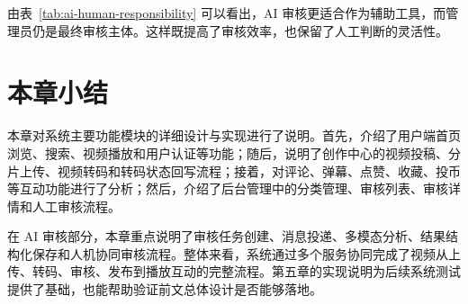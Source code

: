 由表~\ref{tab:ai-human-responsibility} 可以看出，AI 审核更适合作为辅助工具，而管理员仍是最终审核主体。这样既提高了审核效率，也保留了人工判断的灵活性。

\section{本章小结}
\label{sec:chapter5-summary}

本章对系统主要功能模块的详细设计与实现进行了说明。首先，介绍了用户端首页浏览、搜索、视频播放和用户认证等功能；随后，说明了创作中心的视频投稿、分片上传、视频转码和转码状态回写流程；接着，对评论、弹幕、点赞、收藏、投币等互动功能进行了分析；然后，介绍了后台管理中的分类管理、审核列表、审核详情和人工审核流程。

在 AI 审核部分，本章重点说明了审核任务创建、消息投递、多模态分析、结果结构化保存和人机协同审核流程。整体来看，系统通过多个服务协同完成了视频从上传、转码、审核、发布到播放互动的完整流程。第五章的实现说明为后续系统测试提供了基础，也能帮助验证前文总体设计是否能够落地。
